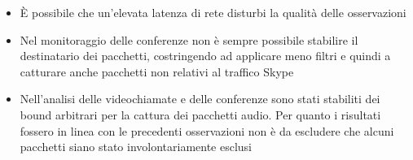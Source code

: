 \begin{itemize}
\item È possibile che un'elevata latenza di rete disturbi la qualità delle osservazioni
\item Nel monitoraggio delle conferenze non è sempre possibile stabilire il destinatario dei pacchetti, costringendo ad applicare meno filtri e quindi a catturare anche pacchetti non relativi al traffico Skype
\item Nell'analisi delle videochiamate e delle conferenze sono stati stabiliti dei bound arbitrari per la cattura dei pacchetti audio. Per quanto i risultati fossero in linea con le precedenti osservazioni non è da escludere che alcuni pacchetti siano stato involontariamente esclusi
\end{itemize}

